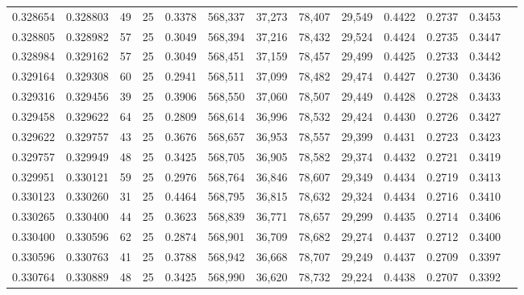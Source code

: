 \begin{tabular}{rrrrrrrrrrrrr}
0.328654 & 0.328803 &    49 &  25 &                                     0.3378 & 568,337 &  37,273 &  78,407 &  29,549 & 0.4422 & 0.2737 & 0.3453 \\
0.328805 & 0.328982 &    57 &  25 &                                     0.3049 & 568,394 &  37,216 &  78,432 &  29,524 & 0.4424 & 0.2735 & 0.3447 \\
0.328984 & 0.329162 &    57 &  25 &                                     0.3049 & 568,451 &  37,159 &  78,457 &  29,499 & 0.4425 & 0.2733 & 0.3442 \\
0.329164 & 0.329308 &    60 &  25 &                                     0.2941 & 568,511 &  37,099 &  78,482 &  29,474 & 0.4427 & 0.2730 & 0.3436 \\
0.329316 & 0.329456 &    39 &  25 &                                     0.3906 & 568,550 &  37,060 &  78,507 &  29,449 & 0.4428 & 0.2728 & 0.3433 \\
0.329458 & 0.329622 &    64 &  25 &                                     0.2809 & 568,614 &  36,996 &  78,532 &  29,424 & 0.4430 & 0.2726 & 0.3427 \\
0.329622 & 0.329757 &    43 &  25 &                                     0.3676 & 568,657 &  36,953 &  78,557 &  29,399 & 0.4431 & 0.2723 & 0.3423 \\
0.329757 & 0.329949 &    48 &  25 &                                     0.3425 & 568,705 &  36,905 &  78,582 &  29,374 & 0.4432 & 0.2721 & 0.3419 \\
0.329951 & 0.330121 &    59 &  25 &                                     0.2976 & 568,764 &  36,846 &  78,607 &  29,349 & 0.4434 & 0.2719 & 0.3413 \\
0.330123 & 0.330260 &    31 &  25 &                                     0.4464 & 568,795 &  36,815 &  78,632 &  29,324 & 0.4434 & 0.2716 & 0.3410 \\
0.330265 & 0.330400 &    44 &  25 &                                     0.3623 & 568,839 &  36,771 &  78,657 &  29,299 & 0.4435 & 0.2714 & 0.3406 \\
0.330400 & 0.330596 &    62 &  25 &                                     0.2874 & 568,901 &  36,709 &  78,682 &  29,274 & 0.4437 & 0.2712 & 0.3400 \\
0.330596 & 0.330763 &    41 &  25 &                                     0.3788 & 568,942 &  36,668 &  78,707 &  29,249 & 0.4437 & 0.2709 & 0.3397 \\
0.330764 & 0.330889 &    48 &  25 &                                     0.3425 & 568,990 &  36,620 &  78,732 &  29,224 & 0.4438 & 0.2707 & 0.3392 \\

\end{tabular}
